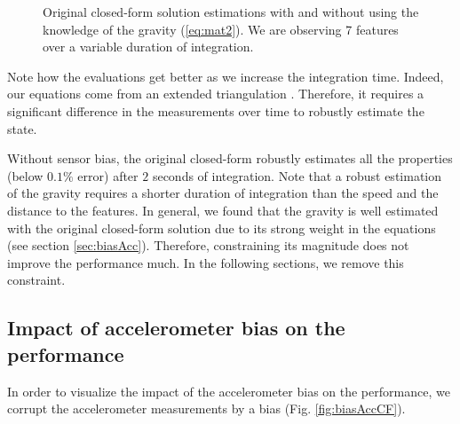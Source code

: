 \documentclass[letterpaper, 10pt, conference, final]{ieeeconf}  %
\begin{document}
\begin{figure}[h!]
  \centering
    \resizebox{0.95\columnwidth}{!}{}
    \caption{Original closed-form solution estimations with and without using the knowledge of the gravity (\ref{eq:mat2}). We are observing 7 features  over a variable duration of integration.\label{fig:original}}
\end{figure}

Note how the evaluations get better as we increase the integration time.
Indeed, our equations come from an extended triangulation \cite{Martinelli2012}.
Therefore, it requires a significant difference in the measurements over time to robustly estimate the state.


Without sensor bias, the original closed-form robustly estimates all the properties (below $0.1\%$ error) after $2$ seconds of integration.
Note that a robust estimation of the gravity requires a shorter duration of integration than the speed and the distance to the features.
In general, we found that the gravity is well estimated with the original closed-form solution due to its strong weight in the equations (see section \ref{sec:biasAcc}).
Therefore, constraining its magnitude does not improve the performance much.
In the following sections, we remove this constraint.



\subsection{Impact of accelerometer bias on the performance \label{sec:biasAcc}}
In order to visualize the impact of the accelerometer bias on the performance,
we corrupt the accelerometer measurements by a bias (Fig. \ref{fig:biasAccCF}).
\end{document}
